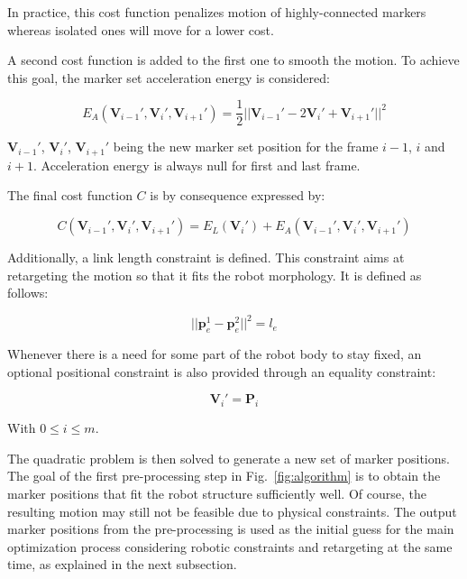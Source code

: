\documentclass[letterpaper, 10 pt, conference]{ieeeconf}  %
\begin{document}
In practice, this cost function penalizes motion of highly-connected
markers whereas isolated ones will move for a lower cost.


A second cost function is added to the first one to smooth the
motion. To achieve this goal, the marker set acceleration energy is
considered:

\begin{equation}
  E_A(\mathbf{V}_{i-1}', \mathbf{V}_{i}', \mathbf{V}_{i+1}') =
  \frac{1}{2} || \mathbf{V}_{i-1}' - 2 \mathbf{V}_{i}' + \mathbf{V}_{i+1}' ||^2
\end{equation}

$\mathbf{V}_{i-1}'$, $\mathbf{V}_{i}'$, $\mathbf{V}_{i+1}'$ being the
new marker set position for the frame $i - 1$, $i$ and $i +
1$. Acceleration energy is always null for first and last frame.

The final cost function $C$ is by consequence expressed by:

\begin{equation}
    C(\mathbf{V}_{i-1}', \mathbf{V}_{i}', \mathbf{V}_{i+1}') =
    E_L(\mathbf{V}_{i}') + E_A(\mathbf{V}_{i-1}', \mathbf{V}_{i}', \mathbf{V}_{i+1}')
\end{equation}


Additionally, a link length constraint is defined. This constraint
aims at retargeting the motion so that it fits the robot
morphology. It is defined as follows:

\begin{equation}
|| \mathbf{p}^1_e - \mathbf{p}^2_e ||^2 = l_e
\end{equation}


Whenever there is a need for some part of the robot body to stay
fixed, an optional positional constraint is also provided through an
equality constraint:

\begin{equation}
  \mathbf{V}_i' = \mathbf{P}_i
\end{equation}

With $0 \leq i \leq m$.



The quadratic problem is then solved to generate a new set of marker
positions. 
The goal of the first pre-processing step in Fig.~\ref{fig:algorithm}
is to obtain the 
marker positions that fit the robot structure sufficiently well.
Of course, the resulting motion may still not be feasible due to
physical constraints.
The output marker positions from the pre-processing is used as the
initial guess for the main optimization process considering robotic
constraints and retargeting at the same time, as explained in the next
subsection. 
\end{document}
